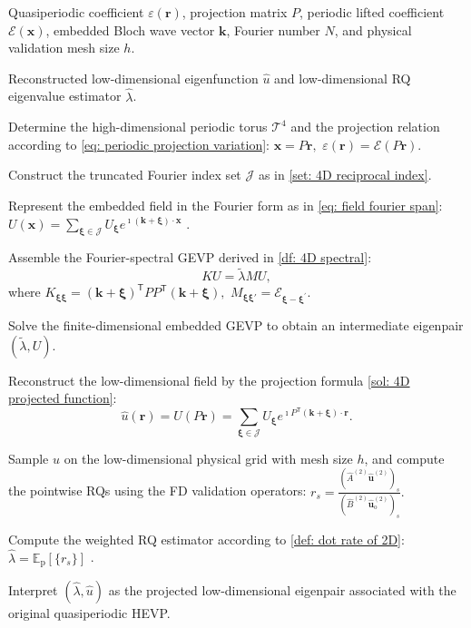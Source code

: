\documentclass[11pt]{article}
\numberwithin{equation}{section}
\begin{document}
\begin{algorithm}[htbp]
\caption{Projected Fourier-pseudospectral method for quasiperiodic HEVPs}
\label{alg: projected spectral method}
\begin{algorithmic}[1]

\Require Quasiperiodic coefficient $\varepsilon(\mathbf r)$, projection matrix
$P$, periodic lifted coefficient $\mathcal E(\mathbf x)$, embedded Bloch wave
vector $\mathbf k$, Fourier number $N$, and physical validation mesh size
$h$.

\Ensure Reconstructed low-dimensional eigenfunction $\widehat u$ and
low-dimensional RQ eigenvalue estimator $\widehat{\lambda}$.

\State Determine the high-dimensional periodic torus $\mathcal T^4$ and the
projection relation according to \eqref{eq: periodic projection variation}: $\mathbf x=P\mathbf r,\,\, \varepsilon(\mathbf r)=\mathcal E(P\mathbf r).$

\State Construct the truncated Fourier index set $\mathcal J$ as in \eqref{set: 4D reciprocal index}.

\State Represent the embedded field in the Fourier form as in \eqref{eq: field fourier span}:
$U(\mathbf x) = \sum_{\boldsymbol{\xi}\in\mathcal J}
U_{\boldsymbol{\xi}}
e^{\imath(\mathbf k+\boldsymbol{\xi})\cdot\mathbf x}$ .

\State Assemble the Fourier-spectral GEVP
derived in \eqref{df: 4D spectral}:
$$
KU=\widetilde{\lambda}MU,
$$
where $ K_{\boldsymbol{\xi}\boldsymbol{\xi}} = (\mathbf k+\boldsymbol{\xi})^{\mathsf T} PP^{\mathsf T} (\mathbf k+\boldsymbol{\xi}), \,\, M_{\boldsymbol{\xi}\boldsymbol{\xi}'} = \mathcal E_{\boldsymbol{\xi}-\boldsymbol{\xi}^{\prime}}.
$

\State Solve the finite-dimensional embedded GEVP to obtain an intermediate eigenpair $(\widetilde{\lambda},U)$.

\State Reconstruct the low-dimensional field by the projection formula
\eqref{sol: 4D projected function}:
$$
\widehat u(\mathbf r)
=
U(P\mathbf r)
=
\sum_{\boldsymbol{\xi}\in\mathcal J}
U_{\boldsymbol{\xi}}
e^{\imath P^{\mathsf T}(\mathbf k+\boldsymbol{\xi})\cdot\mathbf r}.
$$

\State Sample $\widehat u$ on the low-dimensional physical grid with mesh size
$h$, and compute the pointwise RQs using the FD validation
operators:
$
r_s
=
\frac{(\widehat A^{(2)}\widehat{\mathbf u}^{(2)})_s}
{(\widehat B^{(2)}\widehat{\mathbf u}^{(2)}_{\mathrm{o}})_s}.
$

\State Compute the weighted RQ estimator according to \eqref{def: dot rate of 2D}: $\widehat{\lambda}
=
\mathbb E_{\mathrm p}[\{r_s\}]$ .

\State Interpret $(\widehat{\lambda},\widehat u)$ as the projected
low-dimensional eigenpair associated with the original quasiperiodic HEVP.

\end{algorithmic}
\end{algorithm}
\end{document}
